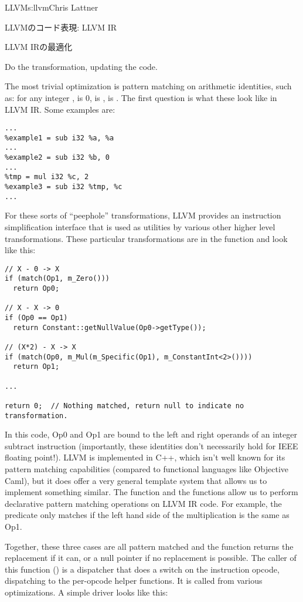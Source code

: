 \begin{aosachapter}{LLVM}{s:llvm}{Chris Lattner}
\begin{aosasect1}{LLVMのコード表現: LLVM IR}
\begin{aosasect2}{LLVM IRの最適化}
\begin{aosaitemize}
  \item Do the transformation, updating the code.

\end{aosaitemize}

The most trivial optimization is pattern matching on arithmetic
identities, such as: for any integer ,  is 0,
 is ,  is .  The first
question is what these look like in LLVM IR\@.  Some examples are:

\begin{verbatim}
...
%example1 = sub i32 %a, %a
...
%example2 = sub i32 %b, 0
...
%tmp = mul i32 %c, 2
%example3 = sub i32 %tmp, %c
...
\end{verbatim}

For these sorts of ``peephole'' transformations, LLVM provides an
instruction simplification interface that is used as utilities by
various other higher level transformations.  These particular
transformations are in the  function and look
like this:

\begin{verbatim}
// X - 0 -> X
if (match(Op1, m_Zero()))
  return Op0;

// X - X -> 0
if (Op0 == Op1)
  return Constant::getNullValue(Op0->getType());

// (X*2) - X -> X
if (match(Op0, m_Mul(m_Specific(Op1), m_ConstantInt<2>())))
  return Op1;

...

return 0;  // Nothing matched, return null to indicate no transformation.
\end{verbatim}

\noindent In this code, Op0 and Op1 are bound to the left and right operands of
an integer subtract instruction (importantly, these identities don't
necessarily hold for IEEE floating point!).  LLVM is implemented in
C++, which isn't well known for its pattern matching capabilities
(compared to functional languages like Objective Caml), but it does
offer a very general template system that allows us to implement
something similar.  The  function and the 
functions allow us to perform declarative pattern matching operations
on LLVM IR code.  For example, the  predicate only
matches if the left hand side of the multiplication is the same as Op1.

Together, these three cases are all pattern matched and the function
returns the replacement if it can, or a null pointer if no replacement
is possible.  The caller of this function ()
is a dispatcher that does a switch on the instruction opcode,
dispatching to the per-opcode helper functions.  It is called from
various optimizations. A simple driver looks like this:


\end{aosasect2}
\end{aosasect1}
\end{aosachapter}
